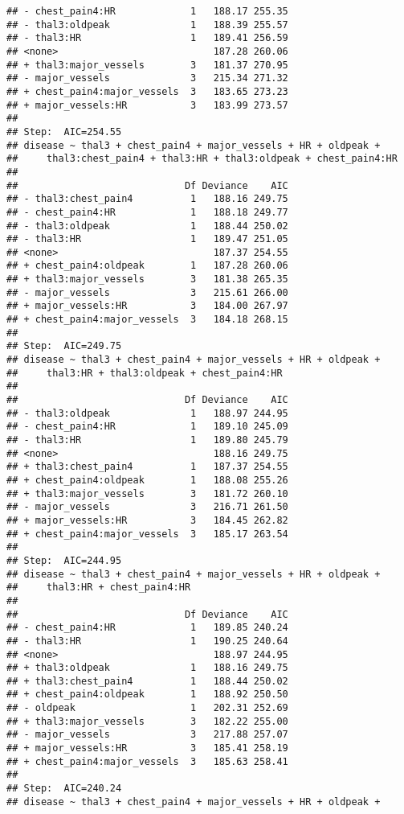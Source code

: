 \documentclass[]{article}
\begin{document}
\begin{verbatim}
## - chest_pain4:HR             1   188.17 255.35
## - thal3:oldpeak              1   188.39 255.57
## - thal3:HR                   1   189.41 256.59
## <none>                           187.28 260.06
## + thal3:major_vessels        3   181.37 270.95
## - major_vessels              3   215.34 271.32
## + chest_pain4:major_vessels  3   183.65 273.23
## + major_vessels:HR           3   183.99 273.57
## 
## Step:  AIC=254.55
## disease ~ thal3 + chest_pain4 + major_vessels + HR + oldpeak + 
##     thal3:chest_pain4 + thal3:HR + thal3:oldpeak + chest_pain4:HR
## 
##                             Df Deviance    AIC
## - thal3:chest_pain4          1   188.16 249.75
## - chest_pain4:HR             1   188.18 249.77
## - thal3:oldpeak              1   188.44 250.02
## - thal3:HR                   1   189.47 251.05
## <none>                           187.37 254.55
## + chest_pain4:oldpeak        1   187.28 260.06
## + thal3:major_vessels        3   181.38 265.35
## - major_vessels              3   215.61 266.00
## + major_vessels:HR           3   184.00 267.97
## + chest_pain4:major_vessels  3   184.18 268.15
## 
## Step:  AIC=249.75
## disease ~ thal3 + chest_pain4 + major_vessels + HR + oldpeak + 
##     thal3:HR + thal3:oldpeak + chest_pain4:HR
## 
##                             Df Deviance    AIC
## - thal3:oldpeak              1   188.97 244.95
## - chest_pain4:HR             1   189.10 245.09
## - thal3:HR                   1   189.80 245.79
## <none>                           188.16 249.75
## + thal3:chest_pain4          1   187.37 254.55
## + chest_pain4:oldpeak        1   188.08 255.26
## + thal3:major_vessels        3   181.72 260.10
## - major_vessels              3   216.71 261.50
## + major_vessels:HR           3   184.45 262.82
## + chest_pain4:major_vessels  3   185.17 263.54
## 
## Step:  AIC=244.95
## disease ~ thal3 + chest_pain4 + major_vessels + HR + oldpeak + 
##     thal3:HR + chest_pain4:HR
## 
##                             Df Deviance    AIC
## - chest_pain4:HR             1   189.85 240.24
## - thal3:HR                   1   190.25 240.64
## <none>                           188.97 244.95
## + thal3:oldpeak              1   188.16 249.75
## + thal3:chest_pain4          1   188.44 250.02
## + chest_pain4:oldpeak        1   188.92 250.50
## - oldpeak                    1   202.31 252.69
## + thal3:major_vessels        3   182.22 255.00
## - major_vessels              3   217.88 257.07
## + major_vessels:HR           3   185.41 258.19
## + chest_pain4:major_vessels  3   185.63 258.41
## 
## Step:  AIC=240.24
## disease ~ thal3 + chest_pain4 + major_vessels + HR + oldpeak + 

\end{verbatim}
\end{document}
